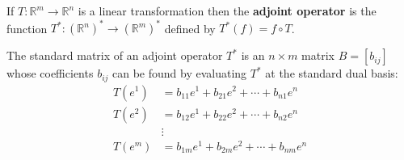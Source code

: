 \begin{definition} If $T:\mathbb{R}^m \to \mathbb{R}^n$ is a linear transformation then the \textbf{adjoint operator} is the function
$T^*:(\mathbb{R}^n)^* \to (\mathbb{R}^m)^*$ defined by $T^*(f)=f \circ T$. 

The standard matrix of an adjoint operator $T^*$ is an $n \times m$ matrix $B=[b_{ij}]$ whose coefficients $b_{ij}$ can be found by evaluating $T^*$ at the 
standard dual basis:
\begin{align*}
T(e^1)&=b_{11}e^1+b_{21}e^2+\cdots+b_{n1}e^n\\
T(e^2)&=b_{12}e^1+b_{22}e^2+\cdots+b_{n2}e^n\\
&\vdots\\
T(e^m)&=b_{1m}e^1+b_{2m}e^2+\cdots+b_{nm}e^n\\
\end{align*}
\end{definition}

